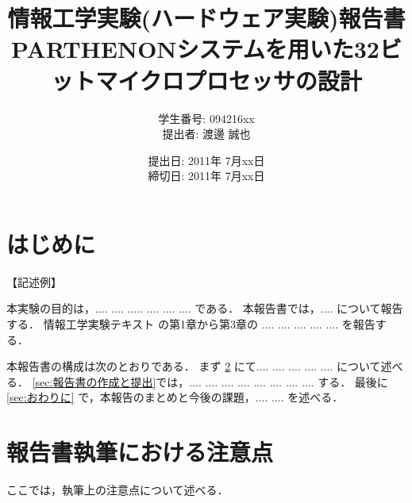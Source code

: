 \documentclass{jarticle}[11pt]
\title{{\normalsize 情報工学実験(ハードウェア実験)報告書}\\
PARTHENONシステムを用いた32ビットマイクロプロセッサの設計
}
\author{ 
  学生番号: 094216xx\\
  提出者: 渡邊 誠也
}
\date{
  提出日: 2011年 7月xx日 \\
  締切日: 2011年 7月xx日
}
\begin{document}
\maketitle

\section{はじめに}

\noindent
【記述例】

本実験の目的は，.... .... ..... .... .... .... である．
本報告書では，.... について報告する．
情報工学実験テキスト \cite{bib:実験テキスト} の第1章から第3章の
.... .... .... .... .... を報告する．

本報告書の構成は次のとおりである．
まず 
\ref{sec:報告書執筆における注意点} にて.... .... .... .... .... 
について述べる．
\ref{sec:報告書の作成と提出}では，.... .... .... .... .... .... 
.... .... する．
最後に \ref{sec:おわりに} で，本報告のまとめと今後の課題，.... .... を述べる．

\section{報告書執筆における注意点}
\label{sec:報告書執筆における注意点}

ここでは，執筆上の注意点について述べる．
\end{document}
